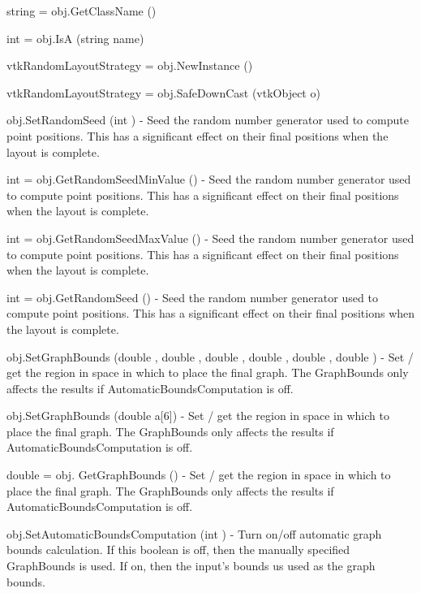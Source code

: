 \begin{DoxyItemize}
\item {\ttfamily string = obj.\-Get\-Class\-Name ()}  
\item {\ttfamily int = obj.\-Is\-A (string name)}  
\item {\ttfamily vtk\-Random\-Layout\-Strategy = obj.\-New\-Instance ()}  
\item {\ttfamily vtk\-Random\-Layout\-Strategy = obj.\-Safe\-Down\-Cast (vtk\-Object o)}  
\item {\ttfamily obj.\-Set\-Random\-Seed (int )} -\/ Seed the random number generator used to compute point positions. This has a significant effect on their final positions when the layout is complete.  
\item {\ttfamily int = obj.\-Get\-Random\-Seed\-Min\-Value ()} -\/ Seed the random number generator used to compute point positions. This has a significant effect on their final positions when the layout is complete.  
\item {\ttfamily int = obj.\-Get\-Random\-Seed\-Max\-Value ()} -\/ Seed the random number generator used to compute point positions. This has a significant effect on their final positions when the layout is complete.  
\item {\ttfamily int = obj.\-Get\-Random\-Seed ()} -\/ Seed the random number generator used to compute point positions. This has a significant effect on their final positions when the layout is complete.  
\item {\ttfamily obj.\-Set\-Graph\-Bounds (double , double , double , double , double , double )} -\/ Set / get the region in space in which to place the final graph. The Graph\-Bounds only affects the results if Automatic\-Bounds\-Computation is off.  
\item {\ttfamily obj.\-Set\-Graph\-Bounds (double a\mbox{[}6\mbox{]})} -\/ Set / get the region in space in which to place the final graph. The Graph\-Bounds only affects the results if Automatic\-Bounds\-Computation is off.  
\item {\ttfamily double = obj. Get\-Graph\-Bounds ()} -\/ Set / get the region in space in which to place the final graph. The Graph\-Bounds only affects the results if Automatic\-Bounds\-Computation is off.  
\item {\ttfamily obj.\-Set\-Automatic\-Bounds\-Computation (int )} -\/ Turn on/off automatic graph bounds calculation. If this boolean is off, then the manually specified Graph\-Bounds is used. If on, then the input's bounds us used as the graph bounds.  

\end{DoxyItemize}
